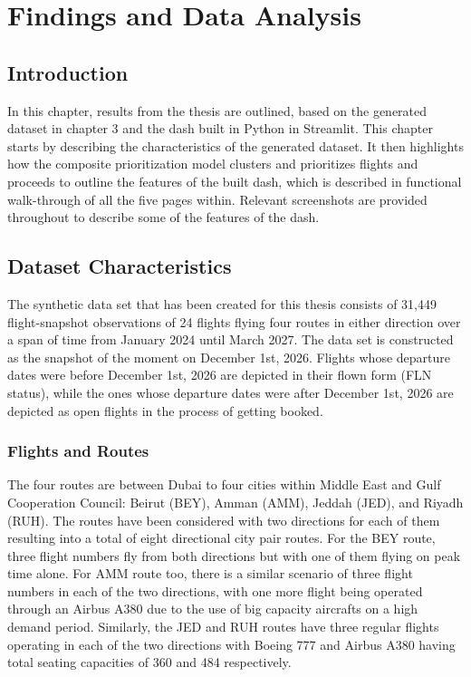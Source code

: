 \chapter{Findings and Data Analysis}
\label{ch:findings}

\section{Introduction}

In this chapter, results from the thesis are outlined, based on the generated dataset in chapter 3 and the dash built in Python in Streamlit. This chapter starts by describing the characteristics of the generated dataset. It then highlights how the composite prioritization model clusters and prioritizes flights and proceeds to outline the features of the built dash, which is described in functional walk-through of all the five pages within. Relevant screenshots are provided throughout to describe some of the features of the dash.

\section{Dataset Characteristics}

The synthetic data set that has been created for this thesis consists of 31,449 flight-snapshot observations of 24 flights flying four routes in either direction over a span of time from January 2024 until March 2027. The data set is constructed as the snapshot of the moment on December 1st, 2026. Flights whose departure dates were before December 1st, 2026 are depicted in their flown form (FLN status), while the ones whose departure dates were after December 1st, 2026 are depicted as open flights in the process of getting booked.

\subsection{Flights and Routes}

The four routes are between Dubai to four cities within Middle East and Gulf Cooperation Council: Beirut (BEY), Amman (AMM), Jeddah (JED), and Riyadh (RUH). The routes have been considered with two directions for each of them resulting into a total of eight directional city pair routes. For the BEY route, three flight numbers fly from both directions but with one of them flying on peak time alone. For AMM route too, there is a similar scenario of three flight numbers in each of the two directions, with one more flight being operated through an Airbus A380 due to the use of big capacity aircrafts on a high demand period. Similarly, the JED and RUH routes have three regular flights operating in each of the two directions with Boeing 777 and Airbus A380 having total seating capacities of 360 and 484 respectively.

